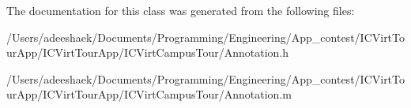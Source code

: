 The documentation for this class was generated from the following files\-:\begin{DoxyCompactItemize}
\item 
/\-Users/adeeshaek/\-Documents/\-Programming/\-Engineering/\-App\-\_\-contest/\-I\-C\-Virt\-Tour\-App/\-I\-C\-Virt\-Tour\-App/\-I\-C\-Virt\-Campus\-Tour/Annotation.\-h\item 
/\-Users/adeeshaek/\-Documents/\-Programming/\-Engineering/\-App\-\_\-contest/\-I\-C\-Virt\-Tour\-App/\-I\-C\-Virt\-Tour\-App/\-I\-C\-Virt\-Campus\-Tour/Annotation.\-m\end{DoxyCompactItemize}
